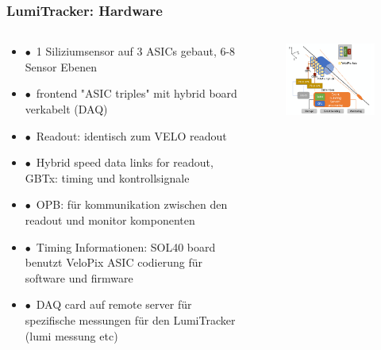\documentclass[aspectratio=1610, 12pt, xcolor=dvipsnames]{beamer}
\begin{document}
\begin{frame}\frametitle{LumiTracker: Hardware}
  \begin{columns}
    \begin{column}[c]{0.48\textwidth}
      \begin{itemize}
        \item $\bullet$\, 1 Siliziumsensor auf 3 ASICs gebaut, 6-8 Sensor Ebenen
        \item $\bullet$\, frontend "ASIC triples" mit hybrid board verkabelt (DAQ)
        \item $\bullet$\, Readout: identisch zum VELO readout
        \item $\bullet$\, Hybrid speed data links for readout, GBTx: timing und kontrollsignale
        \item $\bullet$\, OPB: für kommunikation zwischen den readout und monitor komponenten
        \item $\bullet$\, Timing Informationen: SOL40 board benutzt VeloPix ASIC codierung für software und firmware
        \item $\bullet$\, DAQ card auf remote server für spezifische messungen für den LumiTracker (lumi messung etc)
      \end{itemize}
    \end{column}
    \begin{column}[c]{0.48\textwidth}
      \begin{figure}
	       \centering
	       \includegraphics[width=\textwidth]{plots/lumi_design.png}
      \end{figure}
    \end{column}
  \end{columns}
\end{frame}
\end{document}
